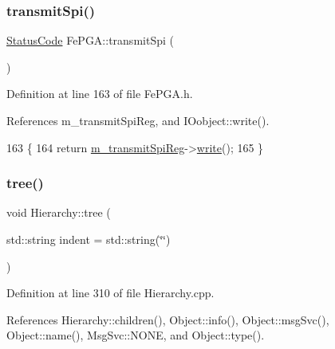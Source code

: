 \subsubsection{\texorpdfstring{transmit\+Spi()}{transmitSpi()}}
{\footnotesize\ttfamily \hyperlink{classStatusCode}{Status\+Code} Fe\+P\+G\+A\+::transmit\+Spi (\begin{DoxyParamCaption}{ }\end{DoxyParamCaption})\hspace{0.3cm}{\ttfamily [inline]}}



Definition at line 163 of file Fe\+P\+G\+A.\+h.



References m\+\_\+transmit\+Spi\+Reg, and I\+Oobject\+::write().


\begin{DoxyCode}
163                            \{
164     \textcolor{keywordflow}{return} \hyperlink{classFePGA_a003ee241fb5f32fb3442174db3fe6f49}{m\_transmitSpiReg}->\hyperlink{classIOobject_a9f6984bc9f0fadcf800f1be2523ac744}{write}();
165   \}
\end{DoxyCode}
\mbox{\label{classHierarchy_a76e914b9a677a22a82deb74d892bf261}} 
\subsubsection{\texorpdfstring{tree()}{tree()}\hspace{0.1cm}{\footnotesize\ttfamily [1/2]}}
{\footnotesize\ttfamily void Hierarchy\+::tree (\begin{DoxyParamCaption}\item[{std\+::string}]{indent = {\ttfamily std\+:\+:string(\char`\"{}\char`\"{})} }\end{DoxyParamCaption})\hspace{0.3cm}{\ttfamily [inherited]}}



Definition at line 310 of file Hierarchy.\+cpp.



References Hierarchy\+::children(), Object\+::info(), Object\+::msg\+Svc(), Object\+::name(), Msg\+Svc\+::\+N\+O\+NE, and Object\+::type().


